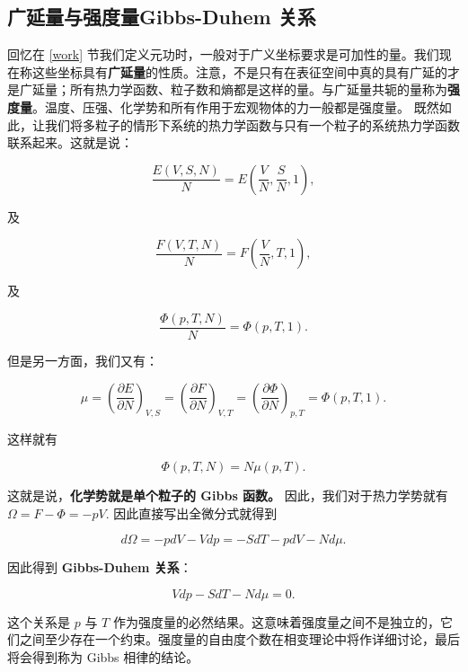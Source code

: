 \subsection{广延量与强度量\quad Gibbs-Duhem 关系}
回忆在 \ref{work} 节我们定义元功时，一般对于广义坐标要求是可加性的量。我们现在称这些坐标具有\textbf{广延量}的性质。注意，不是只有在表征空间中真的具有广延的才是广延量；所有热力学函数、粒子数和熵都是这样的量。与广延量共轭的量称为\textbf{强度量}。温度、压强、化学势和所有作用于宏观物体的力一般都是强度量。
既然如此，让我们将多粒子的情形下系统的热力学函数与只有一个粒子的系统热力学函数联系起来。这就是说：
\begin{linenomath}\begin{equation}
\frac{E(V,S,N)}{N} = E\left( \frac{V}{N},\frac{S}{N},1 \right),
\end{equation}\end{linenomath}
及
\begin{linenomath}\begin{equation}
\frac{F(V,T,N)}{N} = F\left( \frac{V}{N},T,1 \right),
\end{equation}\end{linenomath}
及
\begin{linenomath}\begin{equation}
\frac{\Phi(p,T,N)}{N} = \Phi\left( p,T,1 \right).
\end{equation}\end{linenomath}
但是另一方面，我们又有：
\begin{linenomath}\begin{equation}
\mu = \left( \frac{\partial E}{\partial N} \right)_{V,S} = \left( \frac{\partial F}{\partial N} \right)_{V,T} = \left( \frac{\partial \Phi}{\partial N} \right)_{p,T} = \Phi(p,T,1).
\end{equation}\end{linenomath}
这样就有
\begin{linenomath}\begin{equation}
\Phi(p,T,N) = N\mu(p,T).
\end{equation}\end{linenomath}
这就是说，\textbf{化学势就是单个粒子的 Gibbs 函数。} 因此，我们对于热力学势就有 $\Omega = F - \Phi = -pV.$ 因此直接写出全微分式就得到
\begin{linenomath}\begin{equation}
d\Omega  = -pdV - Vdp = -SdT - pdV - Nd \mu.
\end{equation}\end{linenomath}
因此得到 \textbf{Gibbs-Duhem 关系}：
\begin{linenomath}\begin{equation}
Vdp - SdT - Nd\mu = 0.
\end{equation}\end{linenomath}
这个关系是 $p$ 与 $T$ 作为强度量的必然结果。这意味着强度量之间不是独立的，它们之间至少存在一个约束。强度量的自由度个数在相变理论中将作详细讨论，最后将会得到称为 Gibbs 相律的结论。
